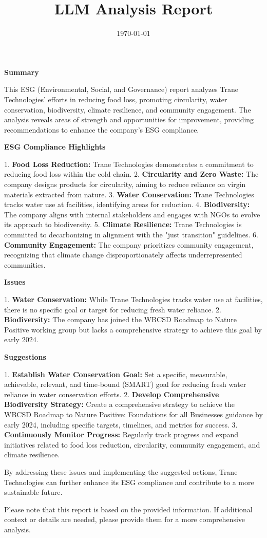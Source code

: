 \documentclass{article}
\title{LLM Analysis Report}
\date{\today}
\begin{document}
                \maketitle

                \textbf{Summary}

This ESG (Environmental, Social, and Governance) report analyzes Trane Technologies' efforts in reducing food loss, promoting circularity, water conservation, biodiversity, climate resilience, and community engagement. The analysis reveals areas of strength and opportunities for improvement, providing recommendations to enhance the company's ESG compliance.

\textbf{ESG Compliance Highlights}

1. \textbf{Food Loss Reduction:} Trane Technologies demonstrates a commitment to reducing food loss within the cold chain.
2. \textbf{Circularity and Zero Waste:} The company designs products for circularity, aiming to reduce reliance on virgin materials extracted from nature.
3. \textbf{Water Conservation:} Trane Technologies tracks water use at facilities, identifying areas for reduction.
4. \textbf{Biodiversity:} The company aligns with internal stakeholders and engages with NGOs to evolve its approach to biodiversity.
5. \textbf{Climate Resilience:} Trane Technologies is committed to decarbonizing in alignment with the "just transition" guidelines.
6. \textbf{Community Engagement:} The company prioritizes community engagement, recognizing that climate change disproportionately affects underrepresented communities.

\textbf{Issues}

1. \textbf{Water Conservation:} While Trane Technologies tracks water use at facilities, there is no specific goal or target for reducing fresh water reliance.
2. \textbf{Biodiversity:} The company has joined the WBCSD Roadmap to Nature Positive working group but lacks a comprehensive strategy to achieve this goal by early 2024.

\textbf{Suggestions}

1. \textbf{Establish Water Conservation Goal:} Set a specific, measurable, achievable, relevant, and time-bound (SMART) goal for reducing fresh water reliance in water conservation efforts.
2. \textbf{Develop Comprehensive Biodiversity Strategy:} Create a comprehensive strategy to achieve the WBCSD Roadmap to Nature Positive: Foundations for all Businesses guidance by early 2024, including specific targets, timelines, and metrics for success.
3. \textbf{Continuously Monitor Progress:} Regularly track progress and expand initiatives related to food loss reduction, circularity, community engagement, and climate resilience.

By addressing these issues and implementing the suggested actions, Trane Technologies can further enhance its ESG compliance and contribute to a more sustainable future.

Please note that this report is based on the provided information. If additional context or details are needed, please provide them for a more comprehensive analysis.

                
\end{document}
